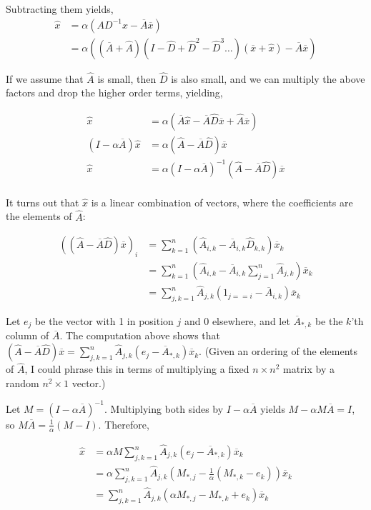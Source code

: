 \documentclass{article}
\newcommand \inv [1] {{#1}^{-1}} %
\begin{document}
Subtracting them yields,
\begin{align*}
\hat x &= \alpha(A\inv D x - \overline A\overline x) \\
&= \alpha((\overline A+\hat A)(I-\hat D+\hat D^2-\hat D^3\ldots)(\overline x+\hat x) - \overline A\overline x)
\end{align*}

If we assume that $\hat A$ is small, then $\hat D$ is also small, and we can multiply the above factors and drop the higher order terms, yielding,

\begin{align*}
\hat x &= \alpha(\overline A\hat x - \overline A\hat D\overline x + \hat A\overline x) \\
(I-\alpha\overline A)\hat x &= \alpha(\hat A - \overline A\hat D)\overline x \\
\hat x &= \alpha (I-\alpha\overline A)^{-1} (\hat A - \overline A\hat D)\overline x \\
\end{align*}

It turns out that $\hat x$ is a linear combination of vectors, where the coefficients are the elements of $\hat A$:

\begin{align*}
((\hat A-\overline A\hat D)\overline x)_i &= \sum_{k=1}^n (\hat A_{i,k} - \overline A_{i,k} \hat D_{k,k}) \overline x_k \\
&= \sum_{k=1}^n (\hat A_{i,k} - \overline A_{i,k} \sum_{j=1}^n \hat A_{j,k}) \overline x_k \\
&= \sum_{j,k=1}^n \hat A_{j,k}(1_{j==i}-\overline A_{i,k})\overline x_k
\end{align*}

Let $e_j$ be the vector with 1 in position $j$ and 0 elsewhere, and let $\overline A_{*,k}$ be the $k$'th column of $\overline A$. The computation above shows that $(\hat A-\overline A\hat D)\overline x = \sum_{j,k=1}^n \hat A_{j,k}(e_j-\overline A_{*,k})\overline x_k$. (Given an ordering of the elements of $\hat A$, I could phrase this in terms of multiplying a fixed $n\times n^2$ matrix by a random $n^2\times 1$ vector.)

Let $M=(I-\alpha\overline A)^{-1}$. Multiplying both sides by $I-\alpha\overline A$ yields $M-\alpha M\overline A = I$, so $M\overline A = \frac 1 \alpha (M-I)$. Therefore,

\begin{align*}
\hat x &= \alpha M \sum_{j,k=1}^n \hat A_{j,k}(e_j-\overline A_{*,k})\overline x_k \\
&= \alpha \sum_{j,k=1}^n \hat A_{j,k} (M_{*,j} - \frac 1 \alpha (M_{*,k} - e_k))\overline x_k \\
&= \sum_{j,k=1}^n \hat A_{j,k} (\alpha M_{*,j} - M_{*,k} + e_k) \overline x_k
\end{align*}
\end{document}
